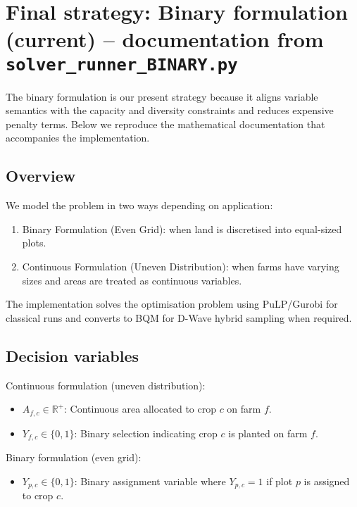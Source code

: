 \documentclass[11pt,a4paper]{article}
\begin{document}
\section{Final strategy: Binary formulation (current) -- documentation from \texttt{solver\_runner\_BINARY.py}}

The binary formulation is our present strategy because it aligns variable semantics with the capacity and diversity constraints and reduces expensive penalty terms. Below we reproduce the mathematical documentation that accompanies the implementation.

\subsection{Overview}

We model the problem in two ways depending on application:
\begin{enumerate}
    \item Binary Formulation (Even Grid): when land is discretised into equal-sized plots.
    \item Continuous Formulation (Uneven Distribution): when farms have varying sizes and areas are treated as continuous variables.
\end{enumerate}

The implementation solves the optimisation problem using PuLP/Gurobi for classical runs and converts to BQM for D-Wave hybrid sampling when required.

\subsection{Decision variables}

Continuous formulation (uneven distribution):
\begin{itemize}
    \item $A_{f,c} \in \mathbb{R}^+$: Continuous area allocated to crop $c$ on farm $f$.
    \item $Y_{f,c} \in \{0,1\}$: Binary selection indicating crop $c$ is planted on farm $f$.
\end{itemize}

Binary formulation (even grid):
\begin{itemize}
    \item $Y_{p,c} \in \{0,1\}$: Binary assignment variable where $Y_{p,c}=1$ if plot $p$ is assigned to crop $c$.
\end{itemize}
\end{document}
